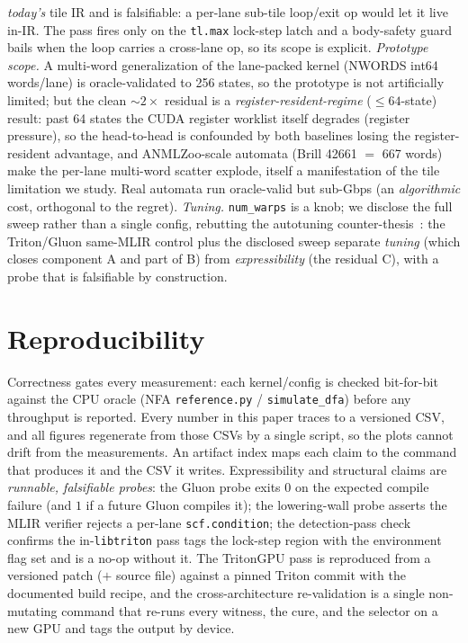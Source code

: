 \documentclass[manuscript,review,anonymous]{acmart}
\begin{document}
\emph{today's} tile IR and is falsifiable: a per-lane sub-tile loop/exit op would let it live in-IR. The
pass fires only on the \texttt{tl.max} lock-step latch and a body-safety guard bails when the loop carries
a cross-lane op, so its scope is explicit. \emph{Prototype scope.} A multi-word
generalization of the lane-packed kernel (NWORDS int64 words/lane) is oracle-validated to 256 states,
so the prototype is not artificially limited; but the clean ${\sim}2\times$ residual is a
\emph{register-resident-regime} ($\le 64$-state) result: past 64 states the CUDA register worklist
itself degrades (register pressure), so the head-to-head is confounded by both baselines losing the
register-resident advantage, and ANMLZoo-scale automata (Brill 42661 $=$ 667 words) make the per-lane
multi-word scatter explode, itself a manifestation of the tile limitation we study. Real automata run
oracle-valid but sub-Gbps (an \emph{algorithmic} cost, orthogonal to the regret). \emph{Tuning.} \texttt{num\_warps} is a knob; we
disclose the full sweep rather than a single config, rebutting the autotuning
counter-thesis~\cite{ringlein2025}: the Triton/Gluon same-MLIR control plus the disclosed sweep
separate \emph{tuning} (which closes component A and part of B) from \emph{expressibility} (the
residual C), with a probe that is falsifiable by construction.

\section{Reproducibility}
Correctness gates every measurement: each kernel/config is checked bit-for-bit against the CPU oracle
(NFA \texttt{reference.py} / \texttt{simulate\_dfa}) before any throughput is reported. Every number in
this paper traces to a versioned CSV, and all figures regenerate from those CSVs by a single script, so
the plots cannot drift from the measurements. An artifact index maps each claim to the command that
produces it and the CSV it writes. Expressibility and structural claims are \emph{runnable, falsifiable
probes}: the Gluon probe exits $0$ on the expected compile failure (and $1$ if a future Gluon compiles
it); the lowering-wall probe asserts the MLIR verifier rejects a per-lane \texttt{scf.condition}; the
detection-pass check confirms the in-\texttt{libtriton} pass tags the lock-step region with the
environment flag set and is a no-op without it. The TritonGPU pass is reproduced from a versioned patch
($+$ source file) against a pinned Triton commit with the documented build recipe, and the
cross-architecture re-validation is a single non-mutating command that re-runs every witness, the cure,
and the selector on a new GPU and tags the output by device.
\end{document}
